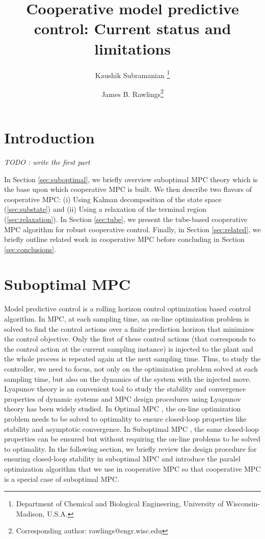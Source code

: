 \documentclass{article}
\title{Cooperative  model predictive control: Current status and  limitations }
\author{Kaushik Subramanian \thanks{Department of Chemical and Biological
     Engineering, University of Wisconsin-Madison, U.S.A.}  \and James
  B. Rawlings\footnotemark[1] \thanks{Corresponding author: rawlings@engr.wisc.edu}}
\theoremstyle{definition}
\begin{document}
\maketitle
\section{Introduction}
\label{sec:introduction}
{\em{TODO : write the first part}}

In Section \ref{sec:suboptimal}, we briefly overview suboptimal MPC
theory which is the base upon which cooperative MPC is built. We then describe two flavors of cooperative MPC:
(i) Using Kalman decomposition of the state space (\ref{sec:substate})
and (ii) Using a relaxation of the terminal region
(\ref{sec:relaxation}). In Section \ref{sec:tube}, we present the
tube-based cooperative MPC algorithm for robust cooperative
control. Finally, in Section \ref{sec:related}, we briefly outline
related work in cooperative MPC before concluding in Section
\ref{sec:conclusions}.

\section{Suboptimal MPC}
Model predictive control is a rolling horizon control optimization
based control algorithm. In MPC, at each sampling time, an on-line
optimization problem is solved to find the control actions over a
finite prediction horizon that minimizes the control objective. Only
the first of these control actions (that corresponds to the control
action at the current sampling instance) is injected to the plant and
the whole process is repeated again at the next sampling time. Thus,
to study the controller, we need to focus, not only on the
optimization problem solved at each sampling time, but also on the
dynamics of the system with the injected move. Lyapunov theory is an
convenient tool to study the stability and convergence properties of
dynamic systems and MPC design procedures using Lyapunov theory has
been widely studied. In Optimal MPC \citep[Chapter
  2]{rawlings:mayne:2009}, the on-line optimization problem needs to
be solved to optimality to ensure closed-loop properties like
stability and asymptotic convergence. In Suboptimal MPC
\citep{pannocchia:rawlings:wright:2011,scokaert:mayne:rawlings:1999},
the same closed-loop properties can be ensured but without requiring
the on-line problems to be solved to optimality. In the following
section, we briefly review the design procedure for ensuring
closed-loop stability in suboptimal MPC and introduce the paralel
optimization algorithm that we use in cooperative MPC so that
cooperative MPC is a special case of suboptimal MPC.
 
\end{document}
